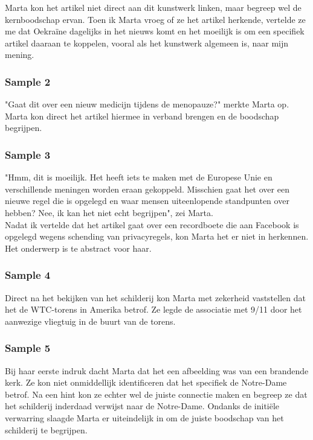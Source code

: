 Marta kon het artikel niet direct aan dit kunstwerk linken, maar begreep wel de kernboodschap ervan. Toen ik Marta vroeg of ze het artikel herkende, vertelde ze me dat Oekraïne dagelijks in het nieuws komt en het moeilijk is om een specifiek artikel daaraan te koppelen, vooral als het kunstwerk algemeen is, naar mijn mening.

\subsubsection{Sample 2}
"Gaat dit over een nieuw medicijn tijdens de menopauze?" merkte Marta op. \\

Marta kon direct het artikel hiermee in verband brengen en de boodschap begrijpen.

\subsubsection{Sample 3}
"Hmm, dit is moeilijk. Het heeft iets te maken met de Europese Unie en verschillende meningen worden eraan gekoppeld. Misschien gaat het over een nieuwe regel die is opgelegd en waar mensen uiteenlopende standpunten over hebben? Nee, ik kan het niet echt begrijpen", zei Marta. \\

Nadat ik vertelde dat het artikel gaat over een recordboete die aan Facebook is opgelegd wegens schending van privacyregels, kon Marta het er niet in herkennen. Het onderwerp is te abstract voor haar.

\subsubsection{Sample 4}
Direct na het bekijken van het schilderij kon Marta met zekerheid vaststellen dat het de WTC-torens in Amerika betrof. Ze legde de associatie met 9/11 door het aanwezige vliegtuig in de buurt van de torens.

\subsubsection{Sample 5}
Bij haar eerste indruk dacht Marta dat het een afbeelding was van een brandende kerk. Ze kon niet onmiddellijk identificeren dat het specifiek de Notre-Dame betrof. Na een hint kon ze echter wel de juiste connectie maken en begreep ze dat het schilderij inderdaad verwijst naar de Notre-Dame. Ondanks de initiële verwarring slaagde Marta er uiteindelijk in om de juiste boodschap van het schilderij te begrijpen.
